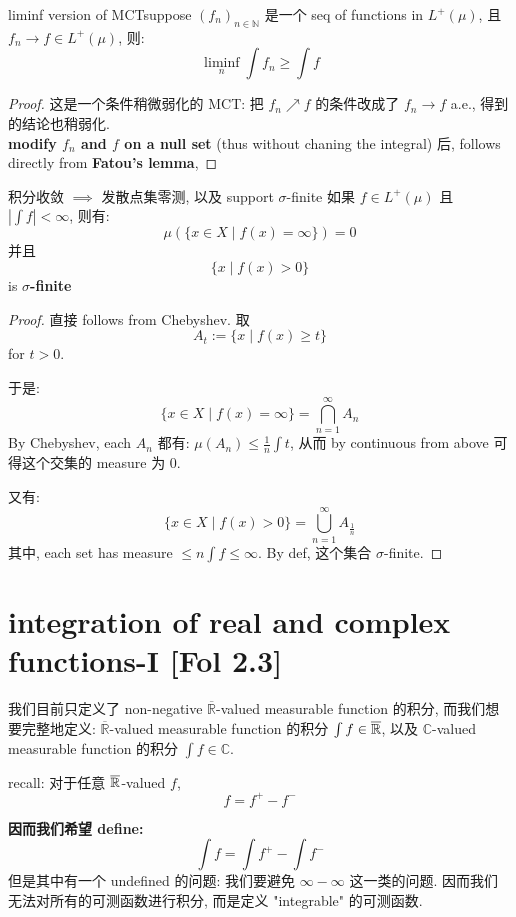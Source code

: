 \documentclass[lang=cn,11pt]{elegantbook}
\begin{document}
\begin{corollary}{liminf version of MCT}suppose $(f_n)_{n\in\mathbb{N}} $ 是一个 seq of functions in $L^+(\mu)$, 且 $f_n \rightarrow f \in L^+(\mu)$, 则:
$$
\liminf_n \int f_n \geq \int f
$$
\end{corollary}
\begin{proof}
    这是一个条件稍微弱化的 MCT: 把 $f_n\nearrow f$ 的条件改成了 $f_n \rightarrow f$ a.e., 得到的结论也稍弱化.\\
   \textbf{ modify $f_n$ and $f$ on a null set} (thus without chaning the integral) 后, follows directly from \textbf{Fatou's lemma}, 
\end{proof}


\begin{theorem}{积分收敛 $\implies$ 发散点集零测, 以及 support $\sigma$-finite}
    如果 $f\in L^+(\mu)$ 且 $|\int f| < \infty$, 则有: \[   \mu( \{x\in X \mid f(x) = \infty\} ) = 0\] 并且 \[ \{ x \mid f(x) > 0  \}\] is \textbf{$\sigma$-finite}
\end{theorem}

\begin{proof}
    直接 follows from Chebyshev. 取 \[ A_t := \{ x \mid f(x) \geq t\}\] for $t > 0 $.

于是: \[ \{x\in X \mid f(x) = \infty\}  = \bigcap_{n=1}^\infty A_n  \]
By Chebyshev, each $A_n$ 都有: $\mu(A_n) \leq \frac{1}{n} \int t$, 从而 by continuous from above 可得这个交集的 measure 为 0.

又有:\[ \{x\in X \mid f(x) >0 \} = \bigcup_{n=1}^\infty A_{\frac{1}{n}} \]
其中, each set has measure $\leq n\int f \leq \infty$. By def, 这个集合 $\sigma$-finite.
\end{proof}



\chapter{integration of real and complex functions-I [Fol 2.3]}

我们目前只定义了 non-negative $\overline{\mathbb{R}}$-valued measurable function 的积分, 而我们想要完整地定义: $\overline{\mathbb{R}}$-valued measurable function 的积分 $\int f \in \overline{\mathbb{R}}$, 以及 $\mathbb{C}$-valued  measurable function 的积分 $\int f \in \mathbb{C}$.

recall: 对于任意 $\overline{\mathbb{R}}$-valued $f$, \[f = f^+ - f^-\]

\textbf{因而我们希望 define:}\[ \int f = \int f^+ -\int f^-\]
但是其中有一个 undefined 的问题: 我们要避免 $\infty - \infty$ 这一类的问题. 因而我们无法对所有的可测函数进行积分, 而是定义 "integrable" 的可测函数.
\end{document}
